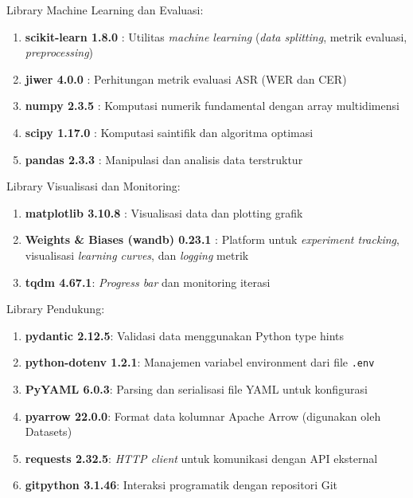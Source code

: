 \vspace{0.3cm}
\noindent
Library Machine Learning dan Evaluasi:
\begin{enumerate}[noitemsep]
    \item \textbf{scikit-learn 1.8.0} \cite{pedregosa2011scikitlearn}: Utilitas \textit{machine learning} (\textit{data splitting}, metrik evaluasi, \textit{preprocessing})
    \item \textbf{jiwer 4.0.0} \cite{morris2004wer}: Perhitungan metrik evaluasi ASR (WER dan CER)
    \item \textbf{numpy 2.3.5} \cite{harris2020numpy}: Komputasi numerik fundamental dengan array multidimensi
    \item \textbf{scipy 1.17.0} \cite{virtanen2020scipy}: Komputasi saintifik dan algoritma optimasi
    \item \textbf{pandas 2.3.3} \cite{mckinney2010pandas}: Manipulasi dan analisis data terstruktur
\end{enumerate}

\vspace{0.3cm}
\noindent
Library Visualisasi dan Monitoring:
\begin{enumerate}[noitemsep]
    \item \textbf{matplotlib 3.10.8} \cite{hunter2007matplotlib}: Visualisasi data dan plotting grafik
    \item \textbf{Weights \& Biases (wandb) 0.23.1} \cite{biewald2020wandb}: Platform untuk \textit{experiment tracking}, visualisasi \textit{learning curves}, dan \textit{logging} metrik
    \item \textbf{tqdm 4.67.1}: \textit{Progress bar} dan monitoring iterasi
\end{enumerate}

\vspace{0.3cm}
\noindent
Library Pendukung:
\begin{enumerate}[noitemsep]
    \item \textbf{pydantic 2.12.5}: Validasi data menggunakan Python type hints
    \item \textbf{python-dotenv 1.2.1}: Manajemen variabel environment dari file \texttt{.env}
    \item \textbf{PyYAML 6.0.3}: Parsing dan serialisasi file YAML untuk konfigurasi
    \item \textbf{pyarrow 22.0.0}: Format data kolumnar Apache Arrow (digunakan oleh Datasets)
    \item \textbf{requests 2.32.5}: \textit{HTTP client} untuk komunikasi dengan API eksternal
    \item \textbf{gitpython 3.1.46}: Interaksi programatik dengan repositori Git
\end{enumerate}

